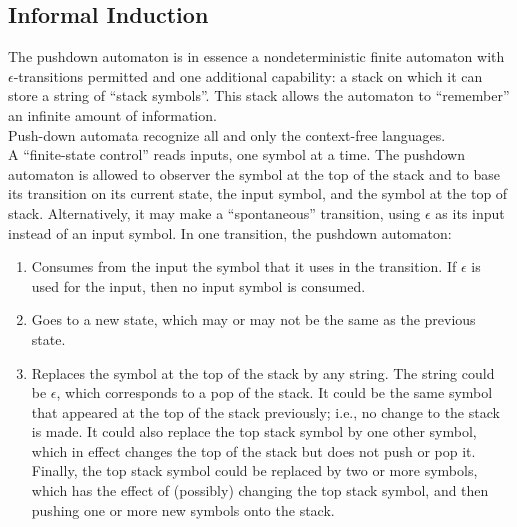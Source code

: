 \documentclass[]{article}
\begin{document}
  \subsection*{Informal Induction}
    The pushdown automaton is in essence a nondeterministic finite automaton
    with $\epsilon$-transitions permitted and one additional capability: a stack
    on which it can store a string of ``stack symbols''. This stack allows the
    automaton to ``remember'' an infinite amount of information. \\
    \indent Push-down automata recognize all and only the context-free
    languages. \\
    \indent A ``finite-state control'' reads inputs, one symbol at a time. The
    pushdown automaton is allowed to observer the symbol at the top of the stack
    and to base its transition on its current state, the input symbol, and the
    symbol at the top of stack. Alternatively, it may make a ``spontaneous''
    transition, using $\epsilon$ as its input instead of an input symbol. In one
    transition, the pushdown automaton:
      \begin{enumerate}
        \item Consumes from the input the symbol that it uses in the transition.
        If $\epsilon$ is used for the input, then no input symbol is consumed.
        \item Goes to a new state, which may or may not be the same as the
        previous state.
        \item Replaces the symbol at the top of the stack by any string. The
        string could be $\epsilon$, which corresponds to a pop of the stack. It
        could be the same symbol that appeared at the top of the stack
        previously; i.e., no change to the stack is made. It could also replace
        the top stack symbol by one other symbol, which in effect changes the
        top of the stack but does not push or pop it. Finally, the top stack
        symbol could be replaced by two or more symbols, which has the effect of
        (possibly) changing the top stack symbol, and then pushing one or more
        new symbols onto the stack.
      \end{enumerate}
\end{document}

